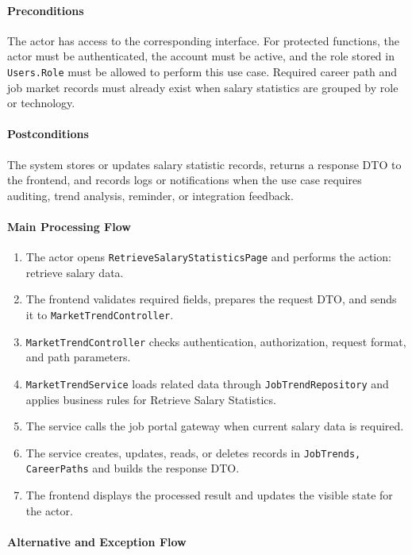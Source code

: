 \paragraph{Preconditions}

The actor has access to the corresponding interface. For protected functions, the actor must be authenticated, the account must be active, and the role stored in \texttt{Users.Role} must be allowed to perform this use case. Required career path and job market records must already exist when salary statistics are grouped by role or technology.

\paragraph{Postconditions}

The system stores or updates salary statistic records, returns a response DTO to the frontend, and records logs or notifications when the use case requires auditing, trend analysis, reminder, or integration feedback.

\paragraph{Main Processing Flow}

\begin{enumerate}
    \item The actor opens \texttt{RetrieveSalaryStatisticsPage} and performs the action: retrieve salary data.
    \item The frontend validates required fields, prepares the request DTO, and sends it to \texttt{MarketTrendController}.
    \item \texttt{MarketTrendController} checks authentication, authorization, request format, and path parameters.
    \item \texttt{MarketTrendService} loads related data through \texttt{JobTrendRepository} and applies business rules for Retrieve Salary Statistics.
    \item The service calls the job portal gateway when current salary data is required.
    \item The service creates, updates, reads, or deletes records in \texttt{JobTrends, CareerPaths} and builds the response DTO.
    \item The frontend displays the processed result and updates the visible state for the actor.
\end{enumerate}

\paragraph{Alternative and Exception Flow}


